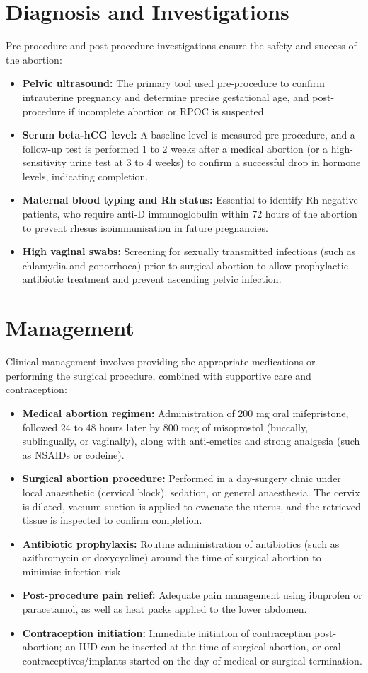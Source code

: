 \section*{Diagnosis and Investigations}
Pre-procedure and post-procedure investigations ensure the safety and success of the abortion:
\begin{itemize}
    \item \textbf{Pelvic ultrasound:} The primary tool used pre-procedure to confirm intrauterine pregnancy and determine precise gestational age, and post-procedure if incomplete abortion or RPOC is suspected.
    \item \textbf{Serum beta-hCG level:} A baseline level is measured pre-procedure, and a follow-up test is performed 1 to 2 weeks after a medical abortion (or a high-sensitivity urine test at 3 to 4 weeks) to confirm a successful drop in hormone levels, indicating completion.
    \item \textbf{Maternal blood typing and Rh status:} Essential to identify Rh-negative patients, who require anti-D immunoglobulin within 72 hours of the abortion to prevent rhesus isoimmunisation in future pregnancies.
    \item \textbf{High vaginal swabs:} Screening for sexually transmitted infections (such as chlamydia and gonorrhoea) prior to surgical abortion to allow prophylactic antibiotic treatment and prevent ascending pelvic infection.
\end{itemize}

\section*{Management}
Clinical management involves providing the appropriate medications or performing the surgical procedure, combined with supportive care and contraception:
\begin{itemize}
    \item \textbf{Medical abortion regimen:} Administration of 200 mg oral mifepristone, followed 24 to 48 hours later by 800 mcg of misoprostol (buccally, sublingually, or vaginally), along with anti-emetics and strong analgesia (such as NSAIDs or codeine).
    \item \textbf{Surgical abortion procedure:} Performed in a day-surgery clinic under local anaesthetic (cervical block), sedation, or general anaesthesia. The cervix is dilated, vacuum suction is applied to evacuate the uterus, and the retrieved tissue is inspected to confirm completion.
    \item \textbf{Antibiotic prophylaxis:} Routine administration of antibiotics (such as azithromycin or doxycycline) around the time of surgical abortion to minimise infection risk.
    \item \textbf{Post-procedure pain relief:} Adequate pain management using ibuprofen or paracetamol, as well as heat packs applied to the lower abdomen.
    \item \textbf{Contraception initiation:} Immediate initiation of contraception post-abortion; an IUD can be inserted at the time of surgical abortion, or oral contraceptives/implants started on the day of medical or surgical termination.
\end{itemize}

